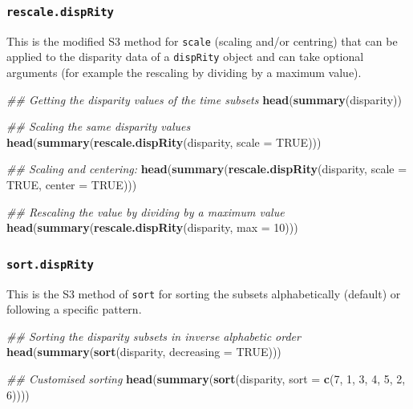 \documentclass[]{book}
\newenvironment{Shaded}{\begin{snugshade}}{\end{snugshade}}
\newcommand{\CommentTok}[1]{\textcolor[rgb]{0.56,0.35,0.01}{\textit{#1}}}
\newcommand{\DataTypeTok}[1]{\textcolor[rgb]{0.13,0.29,0.53}{#1}}
\newcommand{\DecValTok}[1]{\textcolor[rgb]{0.00,0.00,0.81}{#1}}
\newcommand{\KeywordTok}[1]{\textcolor[rgb]{0.13,0.29,0.53}{\textbf{#1}}}
\newcommand{\NormalTok}[1]{#1}
\newcommand{\OtherTok}[1]{\textcolor[rgb]{0.56,0.35,0.01}{#1}}
\begin{document}
\hypertarget{rescale.disprity}{%
\subsubsection{\texorpdfstring{\texttt{rescale.dispRity}}{rescale.dispRity}}\label{rescale.disprity}}

This is the modified S3 method for \texttt{scale} (scaling and/or centring) that can be applied to the disparity data of a \texttt{dispRity} object and can take optional arguments (for example the rescaling by dividing by a maximum value).

\begin{Shaded}
\begin{Highlighting}[]
\CommentTok{## Getting the disparity values of the time subsets}
\KeywordTok{head}\NormalTok{(}\KeywordTok{summary}\NormalTok{(disparity))}

\CommentTok{## Scaling the same disparity values}
\KeywordTok{head}\NormalTok{(}\KeywordTok{summary}\NormalTok{(}\KeywordTok{rescale.dispRity}\NormalTok{(disparity, }\DataTypeTok{scale =} \OtherTok{TRUE}\NormalTok{)))}

\CommentTok{## Scaling and centering:}
\KeywordTok{head}\NormalTok{(}\KeywordTok{summary}\NormalTok{(}\KeywordTok{rescale.dispRity}\NormalTok{(disparity, }\DataTypeTok{scale =} \OtherTok{TRUE}\NormalTok{, }\DataTypeTok{center =} \OtherTok{TRUE}\NormalTok{)))}

\CommentTok{## Rescaling the value by dividing by a maximum value}
\KeywordTok{head}\NormalTok{(}\KeywordTok{summary}\NormalTok{(}\KeywordTok{rescale.dispRity}\NormalTok{(disparity, }\DataTypeTok{max =} \DecValTok{10}\NormalTok{)))}
\end{Highlighting}
\end{Shaded}

\hypertarget{sort.disprity}{%
\subsubsection{\texorpdfstring{\texttt{sort.dispRity}}{sort.dispRity}}\label{sort.disprity}}

This is the S3 method of \texttt{sort} for sorting the subsets alphabetically (default) or following a specific pattern.

\begin{Shaded}
\begin{Highlighting}[]
\CommentTok{## Sorting the disparity subsets in inverse alphabetic order}
\KeywordTok{head}\NormalTok{(}\KeywordTok{summary}\NormalTok{(}\KeywordTok{sort}\NormalTok{(disparity, }\DataTypeTok{decreasing =} \OtherTok{TRUE}\NormalTok{)))}

\CommentTok{## Customised sorting}
\KeywordTok{head}\NormalTok{(}\KeywordTok{summary}\NormalTok{(}\KeywordTok{sort}\NormalTok{(disparity, }\DataTypeTok{sort =} \KeywordTok{c}\NormalTok{(}\DecValTok{7}\NormalTok{, }\DecValTok{1}\NormalTok{, }\DecValTok{3}\NormalTok{, }\DecValTok{4}\NormalTok{, }\DecValTok{5}\NormalTok{, }\DecValTok{2}\NormalTok{, }\DecValTok{6}\NormalTok{))))}
\end{Highlighting}
\end{Shaded}
\end{document}
